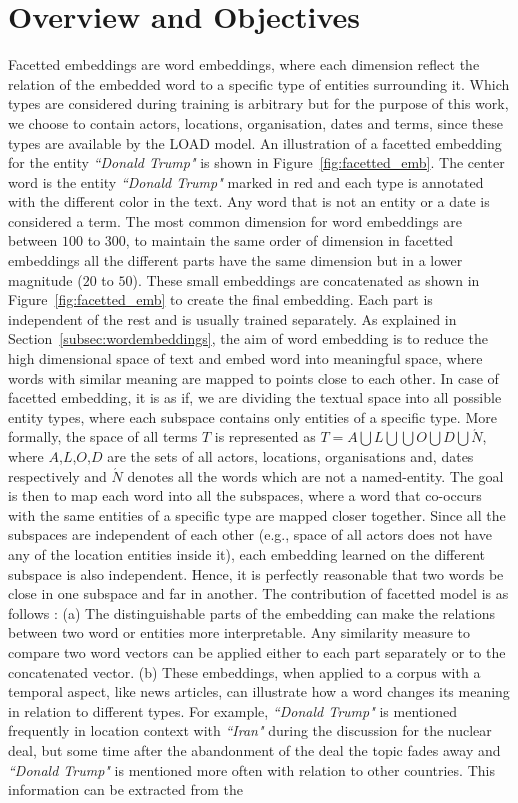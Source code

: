 \section{Overview and Objectives}\label{sec:facetted_overview}
Facetted embeddings are word embeddings, where each dimension reflect the relation of the embedded word to a specific type of entities surrounding it. Which types are considered during training is arbitrary but for the purpose of this work, we choose to contain actors, locations, organisation, dates and terms, since these types are available by the LOAD model. An illustration of a facetted embedding for the entity \emph{``Donald Trump"} is shown in Figure~\ref{fig:facetted_emb}. The center word is the entity \emph{``Donald Trump"} marked in red and each type is annotated with the different color in the text. Any word that is not an entity or a date is considered a term. The most common dimension for word embeddings are between $100$ to $300$, to maintain the same order of dimension in facetted embeddings all the different parts have the same dimension but in a lower magnitude ($20$ to $50$). These small embeddings are concatenated as shown in Figure~\ref{fig:facetted_emb} to create the final embedding. Each part is independent of the rest and is usually trained separately. As explained in Section~\ref{subsec:wordembeddings}, the aim of word embedding is to reduce the high dimensional space of text and embed word into meaningful space, where words with similar meaning are mapped to points close to each other. In case of facetted embedding, it is as if, we are dividing the textual space into all possible entity types, where each subspace contains only entities of a specific type. More formally, the space of all terms $T$ is represented as $T=A\bigcup  L\bigcup  \bigcup  O\bigcup  D\bigcup  \acute {N} $, where $A$,$L$,$O$,$D$ are the sets of all actors, locations, organisations and, dates respectively and $ \acute {N }$ denotes all the words which are not a named-entity. The goal is then to map each word into all the subspaces, where a word that co-occurs with the same entities of a specific type are mapped closer together. Since all the subspaces are independent of each other (e.g., space of all actors does not have any of the location entities inside it), each embedding learned on the different subspace is also independent. Hence, it is perfectly reasonable that two words be close in one subspace and far in another. The contribution of facetted model is as follows : (a) The distinguishable parts of the embedding can make the relations between two word or entities more interpretable. Any similarity measure to compare two word vectors can be applied either to each part separately or to the concatenated vector. (b) These embeddings, when applied to a corpus with a temporal aspect, like news articles, can illustrate how a word changes its meaning in relation to different types. For example, \emph{``Donald Trump"} is mentioned frequently in location context with \emph{``Iran"} during the discussion for the nuclear deal, but some time after the abandonment of the deal the topic fades away and \emph{``Donald Trump"}  is mentioned more often with relation to other countries. This information can be extracted from the 